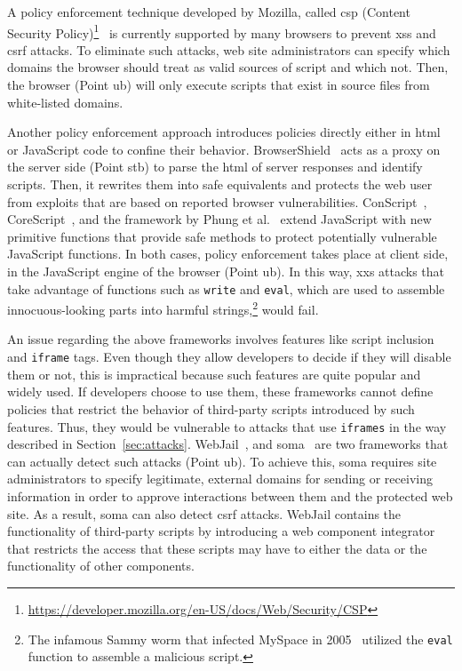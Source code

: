\documentclass[10pt,journal,compsoc]{IEEEtran}
\begin{document}
A policy enforcement technique developed by Mozilla,
called {\sc csp} (Content Security
Policy)\footnote{\url{https://developer.mozilla.org/en-US/docs/Web/Security/CSP}}~\cite{SSM10}
is currently supported by many browsers to prevent
{\sc xss} and {\sc csrf} attacks. To eliminate such
attacks, web site administrators
can specify which domains the browser should treat
as valid sources of script and which not. Then, the browser
(Point {\sc ub}) will only execute scripts that exist in
source files from white-listed domains.

Another policy enforcement approach introduces
policies directly either in {\sc html} or JavaScript code
to confine their behavior. BrowserShield~\cite{RDWDE07}
acts as a proxy on the server side (Point {\sc s}t{\sc b}) to
parse the {\sc html} of server responses and identify
scripts. Then, it rewrites them into safe equivalents
and protects the web user from exploits
that are based on reported browser vulnerabilities.
ConScript~\cite{ML10}, CoreScript~\cite{YCIS07},
and the framework by Phung et al.~\cite{PSC09}
extend JavaScript with new primitive functions that
provide safe methods to protect potentially vulnerable
JavaScript functions. In both cases, policy enforcement takes
place at client side, in the JavaScript engine of the browser (Point {\sc ub}).
In this way, {\sc xxs} attacks that take advantage
of functions such as {\tt write} and {\tt eval}, which are
used to assemble innocuous-looking parts into harmful
strings,\footnote{The infamous Sammy worm that
infected MySpace in 2005~\cite{SP07,ELX07}
utilized the {\tt eval} function to assemble a
malicious script.} would fail.

An issue regarding the above frameworks
involves features like script inclusion
and {\tt iframe} tags. Even though they allow developers
to decide if they will disable them or not,
this is impractical because such features are quite popular and widely used.
If developers choose to use them, these frameworks cannot
define policies that restrict the behavior of third-party
scripts introduced by such features. Thus, they would
be vulnerable to attacks that use {\tt iframes}
in the way described in Section~\ref{sec:attacks}.
WebJail~\cite{VDDPJ11}, and {\sc soma}~\cite{OWVS08}
are two frameworks that can actually detect such attacks (Point {\sc
  ub}). To achieve this, {\sc soma} requires site administrators to
specify legitimate, external domains for sending or receiving
information in order to approve interactions between them and the
protected web site. As a result, {\sc soma} can also detect {\sc csrf}
attacks. WebJail contains the functionality of third-party scripts by
introducing a web component integrator that restricts the access that
these scripts may have to either the data or the functionality of
other components.
\end{document}
